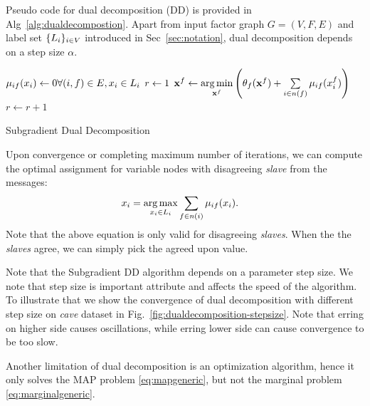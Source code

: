 \documentclass[letterpaper, 10 pt, conference]{ieeeconf} %
\providecommand{\DontPrintSemicolon}{\dontprintsemicolon} %
\DeclareMathOperator*{\argmin}{arg\,min}
\DeclareMathOperator*{\argmax}{arg\,max}
\begin{document}
Pseudo code for dual decomposition (DD) is provided in
Alg~\ref{alg:dualdecompostion}. Apart from input factor graph $G = (V, F, E)$
and label set $\{L_i\}_{i \in V}$ introduced in Sec~\ref{sec:notation}, dual
decomposition depends on a step size $\alpha$.

\begin{algorithm}
  \DontPrintSemicolon

  $\msg{i}{f}{x_i} \assign 0 \hfill \forall (i, f) \in E, x_i \in \Sx$\;
  $r \leftarrow 1$\;
   {
     {%
      $\map^f \assign \argmin\limits_{\map^f} \left( \theta_f(\map^f) + \sum\limits_{i \in n(f)}\msg{i}{f}{x^f_i} \right)$\;
    }
     {
    }
    $r \leftarrow r + 1$\;
  }
  \label{alg:dualdecompostion}
  \caption{Subgradient Dual Decomposition}
\end{algorithm}
Upon convergence or completing maximum number of iterations, we can compute the
optimal assignment for variable nodes with disagreeing \emph{slave} from the
messages:
\begin{align}
  x_i &= \argmax\limits_{x_i \in \Sx} \sum\limits_{f \in n(i)}\msg{i}{f}{x_i}.
\end{align}
Note that the above equation is only valid for disagreeing \emph{slaves}. When the 
the \emph{slaves} agree, we can simply pick the agreed upon value.

Note that the Subgradient DD algorithm depends on a parameter step size. We
note that step size is important attribute and affects the speed of the
algorithm. To illustrate that we show the convergence of dual decomposition
with different step size on \emph{cave} dataset in
Fig.~\ref{fig:dualdecomposition-stepsize}. Note that erring on higher side
causes oscillations, while erring lower side can cause convergence to be too
slow.

Another limitation of dual decomposition is an optimization algorithm, hence it
only solves the MAP problem \eqref{eq:mapgeneric}, but not the marginal problem
\eqref{eq:marginalgeneric}.
\end{document}
